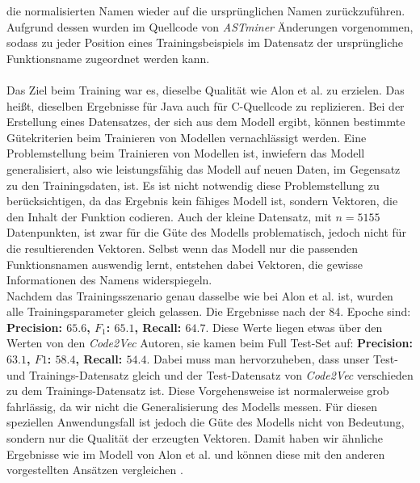 \documentclass[12pt,letterpaper,ngerman]{article}
\begin{document}
die normalisierten Namen wieder auf die ursprünglichen 
Namen zurückzuführen.
Aufgrund dessen wurden im Quellcode von \textit{ASTminer} Änderungen
vorgenommen, sodass zu jeder Position eines Trainingsbeispiels im 
Datensatz der ursprüngliche Funktionsname zugeordnet werden kann. \\
\pagebreak
\hfill\\
Das Ziel beim Training war es, dieselbe Qualität wie Alon et al. zu erzielen. 
Das heißt, dieselben Ergebnisse für Java auch für C-Quellcode zu 
replizieren. Bei der Erstellung eines Datensatzes, der sich aus dem 
Modell ergibt, können bestimmte Gütekriterien beim Trainieren 
von Modellen vernachlässigt werden. Eine Problemstellung beim 
Trainieren von Modellen ist, inwiefern das Modell generalisiert, 
also wie leistungsfähig das Modell auf neuen Daten, im Gegensatz zu 
den Trainingsdaten, ist.
Es ist nicht notwendig diese Problemstellung zu berücksichtigen,
da das 
Ergebnis kein fähiges Modell ist, sondern Vektoren, die den 
Inhalt der Funktion codieren.
Auch der kleine Datensatz, mit $n = 5155 $ Datenpunkten, ist zwar
für die Güte des Modells problematisch, jedoch nicht für die
resultierenden Vektoren. Selbst wenn das Modell nur 
die passenden Funktionsnamen auswendig lernt, entstehen dabei
Vektoren, die gewisse Informationen des Namens widerspiegeln.\\
Nachdem das Trainingsszenario 
genau dasselbe wie bei Alon et al. ist, wurden alle
Trainingsparameter gleich 
gelassen. Die Ergebnisse nach der 84. Epoche sind: 
{\bf Precision: $65.6$, $F_1$: $65.1$,  Recall: $64.7$}. Diese Werte 
liegen etwas über den Werten von den \textit{Code2Vec} Autoren,
sie kamen beim 
Full Test-Set auf: {\bf Precision: $63.1$, $F1$: $58.4$,  Recall: $54.4$}. 
Dabei muss man hervorzuheben, dass unser Test- und 
Trainings-Datensatz gleich
und der Test-Datensatz von \textit{Code2Vec} verschieden zu dem 
Trainings-Datensatz ist. Diese Vorgehensweise ist normalerweise grob 
fahrlässig,
da wir nicht die Generalisierung des Modells messen. 
Für diesen speziellen 
Anwendungsfall ist jedoch die Güte des Modells nicht von Bedeutung,
sondern nur die Qualität der erzeugten Vektoren.
Damit haben wir ähnliche Ergebnisse wie im Modell von Alon et al.
und können diese mit den anderen vorgestellten Ansätzen vergleichen
\cite{code2vec}.
\end{document}
